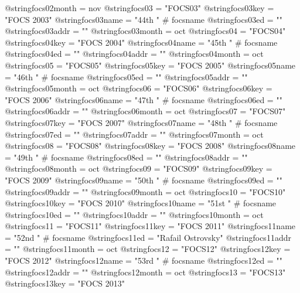 @string{focs02month =           nov}
@string{focs03 =                "FOCS03"}
@string{focs03key =             "FOCS 2003"}
@string{focs03name =            "44th " # focsname}
@string{focs03ed =              ""}
@string{focs03addr =            ""}
@string{focs03month =           oct}
@string{focs04 =                "FOCS04"}
@string{focs04key =             "FOCS 2004"}
@string{focs04name =            "45th " # focsname}
@string{focs04ed =              ""}
@string{focs04addr =            ""}
@string{focs04month =           oct}
@string{focs05 =                "FOCS05"}
@string{focs05key =             "FOCS 2005"}
@string{focs05name =            "46th " # focsname}
@string{focs05ed =              ""}
@string{focs05addr =            ""}
@string{focs05month =           oct}
@string{focs06 =                "FOCS06"}
@string{focs06key =             "FOCS 2006"}
@string{focs06name =            "47th " # focsname}
@string{focs06ed =              ""}
@string{focs06addr =            ""}
@string{focs06month =           oct}
@string{focs07 =                "FOCS07"}
@string{focs07key =             "FOCS 2007"}
@string{focs07name =            "48th " # focsname}
@string{focs07ed =              ""}
@string{focs07addr =            ""}
@string{focs07month =           oct}
@string{focs08 =                "FOCS08"}
@string{focs08key =             "FOCS 2008"}
@string{focs08name =            "49th " # focsname}
@string{focs08ed =              ""}
@string{focs08addr =            ""}
@string{focs08month =           oct}
@string{focs09 =                "FOCS09"}
@string{focs09key =             "FOCS 2009"}
@string{focs09name =            "50th " # focsname}
@string{focs09ed =              ""}
@string{focs09addr =            ""}
@string{focs09month =           oct}
@string{focs10 =                "FOCS10"}
@string{focs10key =             "FOCS 2010"}
@string{focs10name =            "51st " # focsname}
@string{focs10ed =              ""}
@string{focs10addr =            ""}
@string{focs10month =           oct}
@string{focs11 =                "FOCS11"}
@string{focs11key =             "FOCS 2011"}
@string{focs11name =            "52nd " # focsname}
@string{focs11ed =              "Rafail Ostrovsky"}
@string{focs11addr =            ""}
@string{focs11month =           oct}
@string{focs12 =                "FOCS12"}
@string{focs12key =             "FOCS 2012"}
@string{focs12name =            "53rd " # focsname}
@string{focs12ed =              ""}
@string{focs12addr =            ""}
@string{focs12month =           oct}
@string{focs13 =                "FOCS13"}
@string{focs13key =             "FOCS 2013"}

